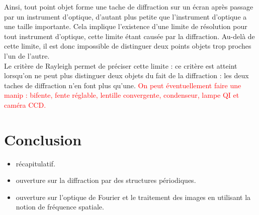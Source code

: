 \documentclass[11pt,a4paper]{report}
\begin{document}
Ainsi, tout point objet forme une tache de diffraction sur un écran après passage par un instrument d'optique, d'autant plus petite que l'instrument d'optique a une taille importante. Cela implique l'existence d'une limite de résolution pour tout instrument d'optique, cette limite étant causée par la diffraction. Au-delà de cette limite, il est donc impossible de distinguer deux points objets trop proches l'un de l'autre.\\ 

Le critère de Rayleigh permet de préciser cette limite : ce critère est atteint lorsqu'on ne peut plus distinguer deux objets du fait de la diffraction : les deux taches de diffraction n'en font plus qu'une. \textcolor{red}{On peut éventuellement faire une manip : bifente, fente réglable, lentille convergente, condenseur, lampe QI et caméra CCD.}

\newpage
\section{Conclusion}
\begin{itemize}
	\item récapitulatif.
	\item ouverture sur la diffraction par des structures périodiques.
	\item ouverture sur l'optique de Fourier et le traitement des images en utilisant la notion de fréquence spatiale.
\end{itemize}
\end{document}
